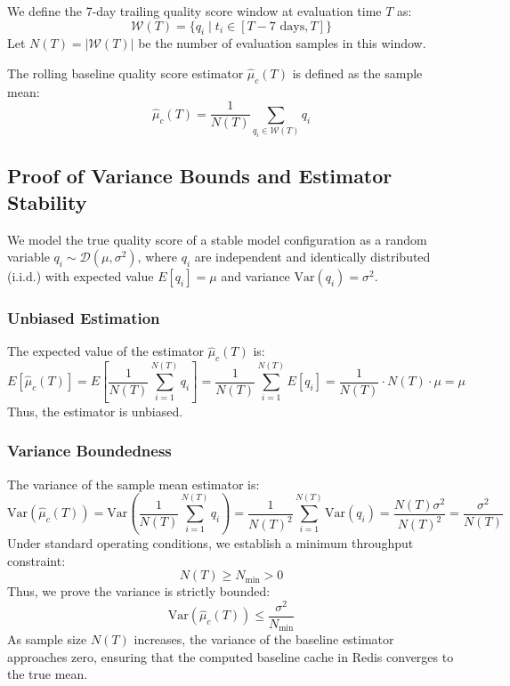 \documentclass[10pt]{article}
\begin{document}
We define the 7-day trailing quality score window at evaluation time $T$ as:
\begin{equation}
\mathcal{W}(T) = \{ q_i \mid t_i \in [T - 7\text{ days}, T] \}
\end{equation}
Let $N(T) = |\mathcal{W}(T)|$ be the number of evaluation samples in this window.

The rolling baseline quality score estimator $\hat{\mu}_c(T)$ is defined as the sample mean:
\begin{equation}
\label{eq:estimator}
\hat{\mu}_c(T) = \frac{1}{N(T)} \sum_{q_i \in \mathcal{W}(T)} q_i
\end{equation}

\subsection{Proof of Variance Bounds and Estimator Stability}
We model the true quality score of a stable model configuration as a random variable $q_i \sim \mathcal{D}(\mu, \sigma^2)$, where $q_i$ are independent and identically distributed (i.i.d.) with expected value $E[q_i] = \mu$ and variance $\text{Var}(q_i) = \sigma^2$.

\subsubsection{Unbiased Estimation}
The expected value of the estimator $\hat{\mu}_c(T)$ is:
\begin{equation}
E[\hat{\mu}_c(T)] = E\left[ \frac{1}{N(T)} \sum_{i=1}^{N(T)} q_i \right] = \frac{1}{N(T)} \sum_{i=1}^{N(T)} E[q_i] = \frac{1}{N(T)} \cdot N(T) \cdot \mu = \mu
\end{equation}
Thus, the estimator is unbiased.

\subsubsection{Variance Boundedness}
The variance of the sample mean estimator is:
\begin{equation}
\text{Var}(\hat{\mu}_c(T)) = \text{Var}\left( \frac{1}{N(T)} \sum_{i=1}^{N(T)} q_i \right) = \frac{1}{N(T)^2} \sum_{i=1}^{N(T)} \text{Var}(q_i) = \frac{N(T) \sigma^2}{N(T)^2} = \frac{\sigma^2}{N(T)}
\end{equation}
Under standard operating conditions, we establish a minimum throughput constraint:
\begin{equation}
N(T) \ge N_{\text{min}} > 0
\end{equation}
Thus, we prove the variance is strictly bounded:
\begin{equation}
\text{Var}(\hat{\mu}_c(T)) \le \frac{\sigma^2}{N_{\text{min}}}
\end{equation}
As sample size $N(T)$ increases, the variance of the baseline estimator approaches zero, ensuring that the computed baseline cache in Redis converges to the true mean.
\end{document}
